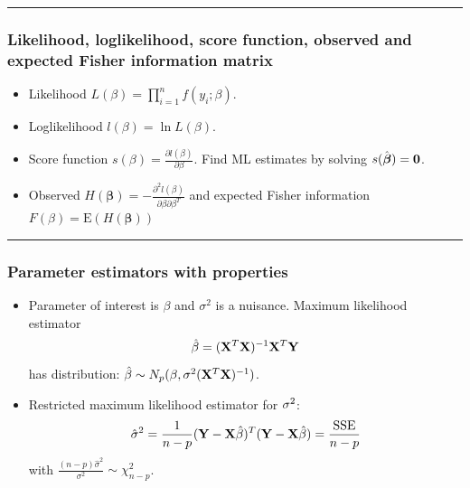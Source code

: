 \documentclass[
]{article}
\providecommand{\tightlist}{%
  \setlength{\itemsep}{0pt}\setlength{\parskip}{0pt}}
\begin{document}
\begin{center}\rule{0.5\linewidth}{0.5pt}\end{center}

\hypertarget{likelihood-loglikelihood-score-function-observed-and-expected-fisher-information-matrix}{%
\subsubsection{Likelihood, loglikelihood, score function, observed and
expected Fisher information
matrix}\label{likelihood-loglikelihood-score-function-observed-and-expected-fisher-information-matrix}}

\begin{itemize}
\tightlist
\item
  Likelihood \(L(\beta)=\prod_{i=1}^n f(y_i; \beta)\).
\item
  Loglikelihood \(l(\beta)=\ln L(\beta)\).
\item
  Score function \(s(\beta)=\frac{\partial l(\beta)}{\partial \beta}\).
  Find ML estimates by solving \(s(\hat{\boldsymbol \beta})={\bf 0}\).
\item
  Observed
  \(H(\boldsymbol{\beta}) = -\frac{\partial^2l(\beta)}{\partial\beta\partial\beta^T}\)
  and expected Fisher information
  \(F(\beta) =\text{E}(H(\boldsymbol{\beta}))\)
\end{itemize}

\begin{center}\rule{0.5\linewidth}{0.5pt}\end{center}

\hypertarget{parameter-estimators-with-properties}{%
\subsubsection{Parameter estimators with
properties}\label{parameter-estimators-with-properties}}

\begin{itemize}
\tightlist
\item
  Parameter of interest is \(\beta\) and \(\sigma^2\) is a nuisance.
  Maximum likelihood estimator
  \[ \hat\beta=({\bf X}^T{\bf X})^{-1} {\bf X}^T {\bf Y}\] has
  distribution:
  \(\hat{\beta}\sim N_{p}(\beta,\sigma^2({\bf X}^T{\bf X})^{-1})\).
\item
  Restricted maximum likelihood estimator for \({\bf \sigma}^2\):
  \[ \hat{\sigma}^2=\frac{1}{n-p}({\bf Y}-{\bf X}\hat{\beta})^T({\bf Y}-{\bf X}\hat{\beta})=\frac{\text{SSE}}{n-p}\]
  with \(\frac{(n-p)\hat{\sigma}^2}{\sigma^2} \sim \chi^2_{n-p}\).
\end{itemize}
\end{document}
